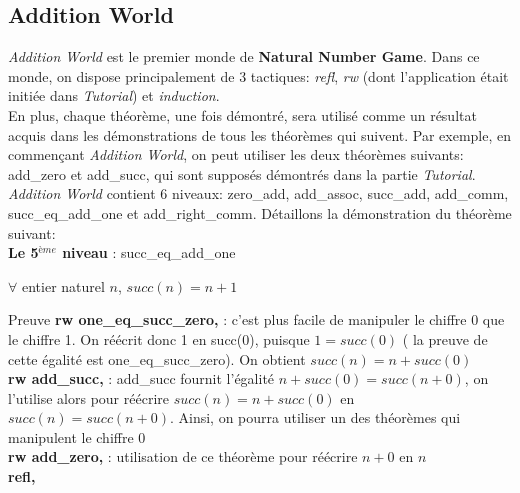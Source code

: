 \subsection{Addition World}
\textit{Addition World} est le premier monde de \textbf{Natural Number Game}. Dans ce monde, on dispose principalement de 3 tactiques: \textit{refl}, \textit{rw} (dont l'application était initiée dans \textit{Tutorial}) et \textit{induction}.\\
En plus, chaque théorème, une fois démontré, sera utilisé comme un résultat acquis dans les démonstrations de tous les théorèmes qui suivent. Par exemple, en commençant \textit{Addition World}, on peut utiliser les deux théorèmes suivants: add\_zero et add\_succ, qui sont supposés démontrés dans la partie \textit{Tutorial}.\\
\textit{Addition World} contient 6 niveaux: zero\_add, add\_assoc, succ\_add, add\_comm, succ\_eq\_add\_one et add\_right\_comm.
Détaillons la démonstration du théorème suivant:\\
\textbf{Le 5$^{ème}$ niveau} : succ\_eq\_add\_one \begin{center}  $\forall$ entier naturel $n$,  $succ(n)=n+1$ \end{center}
Preuve
\textbf{rw one\_eq\_succ\_zero,} : c'est plus facile de manipuler le chiffre 0 que le chiffre 1. On réécrit donc 1 en succ(0), puisque $1=succ(0)$ ( la preuve de cette égalité est one\_eq\_succ\_zero). On obtient $succ(n)=n+succ(0)$\\
 \textbf{rw add\_succ,} : add\_succ fournit l'égalité $n+succ(0)=succ(n+0)$, on l'utilise alors pour réécrire $succ(n)=n+succ(0)$ en $succ(n)=succ(n+0)$. Ainsi, on pourra utiliser un des théorèmes qui manipulent le chiffre 0\\
\textbf{rw add\_zero,} : utilisation de ce théorème pour réécrire $n+0$ en $n$\\
\textbf{refl,}
